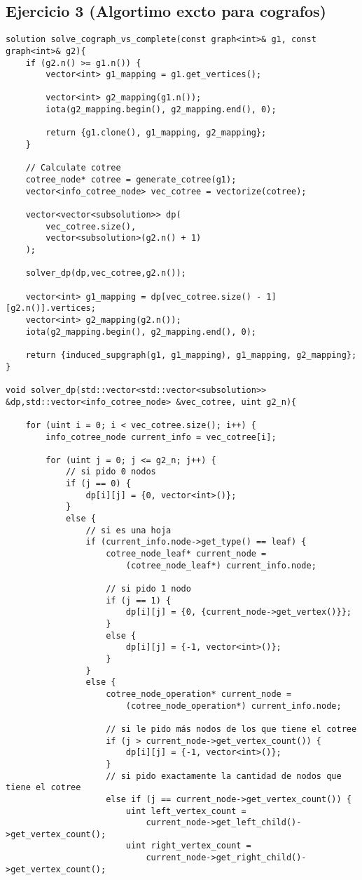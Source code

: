 \subsection{Ejercicio 3 (Algortimo excto para cografos)}
\begin{lstlisting}
solution solve_cograph_vs_complete(const graph<int>& g1, const graph<int>& g2){
	if (g2.n() >= g1.n()) {
		vector<int> g1_mapping = g1.get_vertices();

		vector<int> g2_mapping(g1.n());
		iota(g2_mapping.begin(), g2_mapping.end(), 0);

		return {g1.clone(), g1_mapping, g2_mapping};
	}

	// Calculate cotree
	cotree_node* cotree = generate_cotree(g1);
	vector<info_cotree_node> vec_cotree = vectorize(cotree);

	vector<vector<subsolution>> dp(
		vec_cotree.size(),
		vector<subsolution>(g2.n() + 1)
	);

	solver_dp(dp,vec_cotree,g2.n());

	vector<int> g1_mapping = dp[vec_cotree.size() - 1][g2.n()].vertices;
	vector<int> g2_mapping(g2.n());
	iota(g2_mapping.begin(), g2_mapping.end(), 0);

	return {induced_supgraph(g1, g1_mapping), g1_mapping, g2_mapping};
}

void solver_dp(std::vector<std::vector<subsolution>> &dp,std::vector<info_cotree_node> &vec_cotree, uint g2_n){

    for (uint i = 0; i < vec_cotree.size(); i++) {
        info_cotree_node current_info = vec_cotree[i];

        for (uint j = 0; j <= g2_n; j++) {
            // si pido 0 nodos
            if (j == 0) {
                dp[i][j] = {0, vector<int>()};
            }
            else {
                // si es una hoja
                if (current_info.node->get_type() == leaf) {
                    cotree_node_leaf* current_node =
                        (cotree_node_leaf*) current_info.node;

                    // si pido 1 nodo
                    if (j == 1) {
                        dp[i][j] = {0, {current_node->get_vertex()}};
                    }
                    else {
                        dp[i][j] = {-1, vector<int>()};
                    }
                }
                else {
                    cotree_node_operation* current_node =
                        (cotree_node_operation*) current_info.node;

                    // si le pido más nodos de los que tiene el cotree
                    if (j > current_node->get_vertex_count()) {
                        dp[i][j] = {-1, vector<int>()};
                    }
                    // si pido exactamente la cantidad de nodos que tiene el cotree
                    else if (j == current_node->get_vertex_count()) {
                        uint left_vertex_count =
                            current_node->get_left_child()->get_vertex_count();
                        uint right_vertex_count =
                            current_node->get_right_child()->get_vertex_count();


\end{lstlisting}
